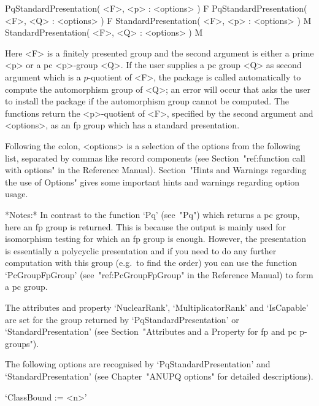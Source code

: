 
\>PqStandardPresentation( <F>, <p> : <options> ) F
\>PqStandardPresentation( <F>, <Q> : <options> ) F
\>StandardPresentation( <F>, <p> : <options> ) M
\>StandardPresentation( <F>, <Q> : <options> ) M

Here <F> is a finitely presented group and the second argument is  either
a prime <p> or a pc <p>-group <Q>. If the user supplies a pc group <Q> as
second argument which is a $p$-quotient of <F>, the package {\AutPGrp} is
called automatically to compute the automorphism group of <Q>;  an  error
will occur that asks the user to install the package  {\AutPGrp}  if  the
automorphism  group  cannot  be  computed.  The  functions   return   the
<p>-quotient of <F>, specified by the second argument and  <options>,  as
an fp group which has a standard presentation.

Following the colon, <options> is a selection of  the  options  from  the
following  list,  separated  by  commas  like  record   components   (see
Section~"ref:function call with options" in the {\GAP} Reference Manual).
Section~"Hints and Warnings regarding the  use  of  Options"  gives  some
important hints and warnings regarding option usage.

*Notes:*
In contrast to the function `Pq' (see~"Pq") which  returns  a  pc  group,
here an fp group is returned. This is because the output is  mainly  used
for isomorphism testing for which an fp group  is  enough.  However,  the
presentation is essentially a polycyclic presentation and if you need  to
do any further computation with this group (e.g.~to find the  order)  you
can use the function `PcGroupFpGroup'  (see~"ref:PcGroupFpGroup"  in  the
{\GAP} Reference Manual) to form a pc group.

The  attributes  and  property  `NuclearRank',  `MultiplicatorRank'   and
`IsCapable' are set for the group returned by `PqStandardPresentation' or
`StandardPresentation' (see Section~"Attributes and a Property for fp and
pc p-groups").

The following options  are  recognised  by  `PqStandardPresentation'  and
`StandardPresentation'  (see   Chapter~"ANUPQ   options"   for   detailed
descriptions).

\beginlist%

\item{}`ClassBound := <n>'

